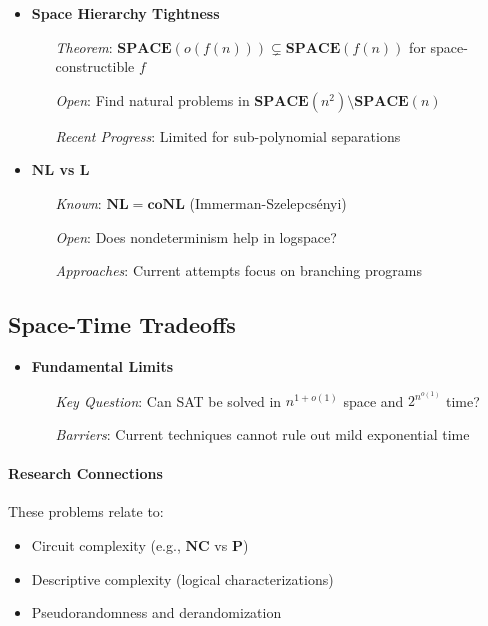 \begin{itemize}
    \item \textbf{Space Hierarchy Tightness}
    \begin{itemize}
        \item[\textit{Theorem}:] $\mathbf{SPACE}(o(f(n))) \subsetneq \mathbf{SPACE}(f(n))$ for space-constructible $f$
        \item[\textit{Open}:] Find natural problems in $\mathbf{SPACE}(n^2) \setminus \mathbf{SPACE}(n)$
        \item[\textit{Recent Progress}:] Limited for sub-polynomial separations
    \end{itemize}

    \item \textbf{$\mathbf{NL}$ vs $\mathbf{L}$}
    \begin{itemize}
        \item[\textit{Known}:] $\mathbf{NL} = \mathbf{coNL}$ (Immerman-Szelepcsényi)
        \item[\textit{Open}:] Does nondeterminism help in logspace?
        \item[\textit{Approaches}:] Current attempts focus on branching programs
    \end{itemize}
\end{itemize}

\subsection{Space-Time Tradeoffs}

\begin{itemize}
    \item \textbf{Fundamental Limits}
    \begin{itemize}
        \item[\textit{Key Question}:] Can SAT be solved in $n^{1+o(1)}$ space and $2^{n^{o(1)}}$ time?
        \item[\textit{Barriers}:] Current techniques cannot rule out mild exponential time
    \end{itemize}
\end{itemize}

\paragraph{Research Connections} These problems relate to:
\begin{itemize}
    \item Circuit complexity (e.g., $\mathbf{NC}$ vs $\mathbf{P}$)
    \item Descriptive complexity (logical characterizations)
    \item Pseudorandomness and derandomization
\end{itemize}

